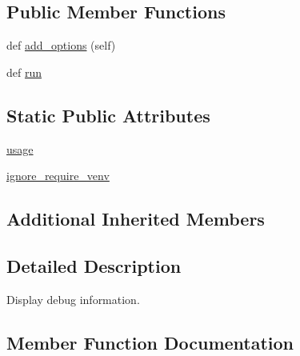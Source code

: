 \subsection*{Public Member Functions}
\begin{DoxyCompactItemize}
\item 
def \hyperlink{classpip_1_1__internal_1_1commands_1_1debug_1_1DebugCommand_a183c446c11b4138a7ff6ab36769cc864}{add\+\_\+options} (self)
\item 
def \hyperlink{classpip_1_1__internal_1_1commands_1_1debug_1_1DebugCommand_ab7ccae29b413f996b8822a72ffe700fb}{run}
\end{DoxyCompactItemize}
\subsection*{Static Public Attributes}
\begin{DoxyCompactItemize}
\item 
\hyperlink{classpip_1_1__internal_1_1commands_1_1debug_1_1DebugCommand_a529ecbda41c52373a77e43136d36f838}{usage}
\item 
\hyperlink{classpip_1_1__internal_1_1commands_1_1debug_1_1DebugCommand_a8560d66862d4eaead37c7b4cc61117fa}{ignore\+\_\+require\+\_\+venv}
\end{DoxyCompactItemize}
\subsection*{Additional Inherited Members}


\subsection{Detailed Description}
\begin{DoxyVerb}Display debug information.
\end{DoxyVerb}
 

\subsection{Member Function Documentation}
\mbox{\label{classpip_1_1__internal_1_1commands_1_1debug_1_1DebugCommand_a183c446c11b4138a7ff6ab36769cc864}} 
